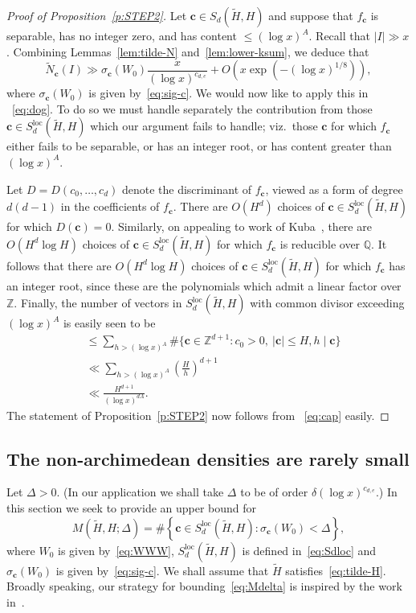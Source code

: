 \documentclass[11pt,letterpaper]{amsart}
\renewcommand{\leq}{\leqslant}
\theoremstyle{definition}
\numberwithin{equation}{section}
\newcommand\ZZ{\mathbb{Z}}
\newcommand\QQ{\mathbb{Q}}
\renewcommand{\c}{\mathbf{c}}
\newcommand{\0}{\mathbf{0}}
\begin{document}
\begin{proof}[Proof of Proposition~\ref{p:STEP2}]
Let $\c\in S_d(\tilde H, H)$ and 
suppose that $f_\c$ is separable, has no integer zero, and has content $\leq (\log x)^{A}$. Recall 
that $|I|\gg x$.
Combining Lemmas~\ref{lem:tilde-N} and~\ref{lem:lower-ksum}, we  deduce that 
\begin{equation}\label{eq:cap}
\tilde N_\c(I) \gg 
\sigma_\c(W_0) \frac{ x}{(\log x)^{c_{d,e}}}
+
O\left( x\exp\left(-(\log x)^{1/8}\right)\right),
\end{equation}
where $\sigma_\c(W_0)$ is given by~\eqref{eq:sig-c}.
We would now like to apply this in ~\eqref{eq:dog}. To do so we must  handle separately the contribution from those $\c \in S_d^{\text{loc}}(\tilde H, H)$ which our argument fails to handle; viz.\ those $\c$ for which 
$f_\c$ either fails to be separable, or has an integer root, or has content greater than $(\log x)^A$. 

Let $D=D(c_0,\dots,c_d)$ denote the discriminant of $f_\c$, viewed as a form of degree $d(d-1)$ in the coefficients of $f_\c$. There 
 are $O(H^{d})$ choices of 
$\c \in S_d^{\text{loc}}(\tilde H, H)$  for which $D(\c)=0$. Similarly, 
on appealing to work of Kuba~\cite{kuba},   
there  are $O(H^d\log H)$ choices of 
$\c \in S_d^{\text{loc}}(\tilde H, H)$ for which $f_\c$ is reducible over $\QQ$. It follows that there are 
 $O(H^d\log H)$ choices of 
$\c \in S_d^{\text{loc}}(\tilde H, H)$ 
for which $f_\c$ has an integer root, since these are the polynomials which admit a linear factor over $\ZZ$.  
Finally, the number of vectors in 
$S_d^{\text{loc}}(\tilde H, H)$  with common divisor exceeding  $(\log x)^A$ is easily seen to be
\begin{align*}
&\leq \sum_{h>(\log x)^A} \#\{\c\in \ZZ^{d+1}: c_0>0, ~|\c|\leq H, h\mid \c\}\\ 
&\ll \sum_{h>(\log x)^A} \left(\frac{H}{h}\right)^{d+1}\\
&\ll \frac{H^{d+1}}{(\log x)^{dA}}.
\end{align*}
The statement of Proposition~\ref{p:STEP2} now  follows
from ~\eqref{eq:cap} easily.
\end{proof}


\subsection{The non-archimedean densities are rarely small  }

Let $\Delta>0$. (In our application we shall take 
$\Delta$ to be of order $\delta (\log x)^{c_{d,e}}$.)
In this section we seek to provide an  upper bound for 
\begin{equation}\label{eq:Mdelta}
M(\tilde H, H;\Delta)=\#\left\{ \c\in S_d^{\text{loc}}(\tilde H, H):  \sigma_\c(W_0) <\Delta
\right\}, 
\end{equation}
where $W_0$ is given by~\eqref{eq:WWW}, 
$S_d^{\text{loc}}(\tilde H, H)$ is defined in~\eqref{eq:Sdloc} and 
$\sigma_\c(W_0)$ is given by~\eqref{eq:sig-c}.
We shall assume that $\tilde H$ satisfies~\eqref{eq:tilde-H}.
Broadly speaking, our strategy for bounding~\eqref{eq:Mdelta} is inspired by  the work in~\cite[\S 5]{fano}.
\end{document}
